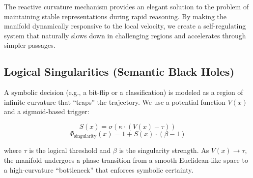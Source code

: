 \documentclass[12pt,a4paper]{article}
\begin{document}
The reactive curvature mechanism provides an elegant solution to the problem of maintaining stable representations during rapid reasoning. By making the manifold dynamically responsive to the local velocity, we create a self-regulating system that naturally slows down in challenging regions and accelerates through simpler passages.

\subsection{Logical Singularities (Semantic Black Holes)}

A symbolic decision (e.g., a bit-flip or a classification) is modeled as a region of infinite curvature that ``traps'' the trajectory. We use a potential function $V(x)$ and a sigmoid-based trigger:

\begin{equation}
S(x) = \sigma\left(\kappa \cdot (V(x) - \tau)\right)
\end{equation}
\begin{equation}
\Phi_{\text{singularity}}(x) = 1 + S(x) \cdot (\beta - 1)
\end{equation}

where $\tau$ is the logical threshold and $\beta$ is the singularity strength. As $V(x) \to \tau$, the manifold undergoes a phase transition from a smooth Euclidean-like space to a high-curvature ``bottleneck'' that enforces symbolic certainty.
\end{document}
